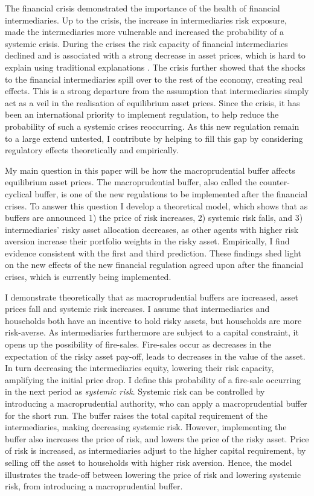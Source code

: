 \documentclass[11pt]{article}
\begin{document}
The financial crisis demonstrated the importance of the health of financial intermediaries. Up to the crisis, the increase in intermediaries risk exposure, made the intermediaries more vulnerable and increased the probability of a systemic crisis. During the crises the risk capacity of financial intermediaries declined and is associated with a strong decrease in asset prices, which is hard to explain using traditional explanations \citep*{He2013, Adrian2014, Brunnermeier2014}. The crisis further showed that the shocks to the financial intermediaries spill over to the rest of the economy, creating real effects.
This is a strong departure from the assumption that intermediaries simply act as a veil in the realisation of equilibrium asset prices. 
Since the crisis, it has been an international priority to implement regulation, to help reduce the probability of such a systemic crises reoccurring. As this new regulation remain to a large extend untested, I contribute by helping to fill this gap by considering regulatory effects theoretically and empirically.

My main question in this paper will be how the macroprudential buffer affects equilibrium asset prices. The macroprudential buffer, also called the counter-cyclical buffer, is one of the new regulations to be implemented after the financial crises. To answer this question I develop a theoretical model, which shows that as buffers are announced 1) the price of risk increases, 2) systemic risk falls, and 3) intermediaries' risky asset allocation decreases, as other agents with higher risk aversion increase their portfolio weights in the risky asset.
Empirically, I find evidence consistent with the first and third prediction. These findings shed light on the new effects of the new financial regulation agreed upon after the financial crises, which is currently being implemented.


I demonstrate theoretically that as macroprudential buffers are increased, asset prices fall and systemic risk increases. I assume that intermediaries and households both have an incentive to hold risky assets, but households are more risk-averse. As intermediaries furthermore are subject to a capital constraint, it opens up the possibility of fire-sales. Fire-sales occur as decreases in the expectation of the risky asset pay-off, leads to decreases in the value of the asset. In turn decreasing the intermediaries equity, lowering their risk capacity, amplifying the initial price drop. I define this probability of a fire-sale occurring in the next period as \emph{systemic risk}. Systemic risk can be controlled by introducing a macroprudential authority, who can apply a macroprudential buffer for the short run. The buffer raises the total capital requirement of the intermediaries, making decreasing systemic risk. However, implementing the buffer also increases the price of risk, and lowers the price of the risky asset. Price of risk is increased, as intermediaries adjust to the higher capital requirement, by selling off the asset to households with higher risk aversion. Hence, the model illustrates the trade-off between lowering the price of risk and lowering systemic risk, from introducing a macroprudential buffer.
 
\end{document}
